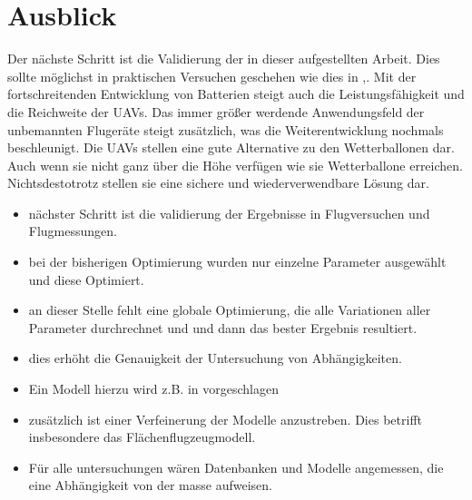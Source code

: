 \section{Ausblick}
Der nächste Schritt ist die Validierung der in dieser aufgestellten Arbeit. Dies sollte möglichst in praktischen Versuchen geschehen wie dies in \cite{Ostler.2007},\cite{PCUP}. Mit der fortschreitenden Entwicklung von Batterien steigt auch die Leistungsfähigkeit und die Reichweite der UAVs. Das immer größer werdende Anwendungsfeld der unbemannten Flugeräte steigt zusätzlich, was die Weiterentwicklung nochmals beschleunigt.
Die UAVs stellen eine gute Alternative zu den Wetterballonen dar. Auch wenn sie nicht ganz über die Höhe verfügen wie sie Wetterballone erreichen. Nichtsdestotrotz stellen sie eine sichere und wiederverwendbare Lösung dar.

\begin{itemize}
	\item nächster Schritt ist die validierung der Ergebnisse in Flugversuchen und Flugmessungen. 
	\item bei der bisherigen Optimierung wurden nur einzelne Parameter ausgewählt und diese Optimiert. 
	\item an dieser Stelle fehlt eine globale Optimierung, die alle Variationen aller Parameter durchrechnet und und dann das bester Ergebnis resultiert. 
	\item dies erhöht die Genauigkeit der Untersuchung von Abhängigkeiten.
	\item Ein Modell hierzu wird z.B. in \cite{Magnussen.2015} vorgeschlagen
	\item zusätzlich ist einer Verfeinerung der Modelle anzustreben. Dies betrifft insbesondere das Flächenflugzeugmodell.
	\item Für alle untersuchungen wären Datenbanken und Modelle angemessen, die eine Abhängigkeit von der masse aufweisen.
\end{itemize}
